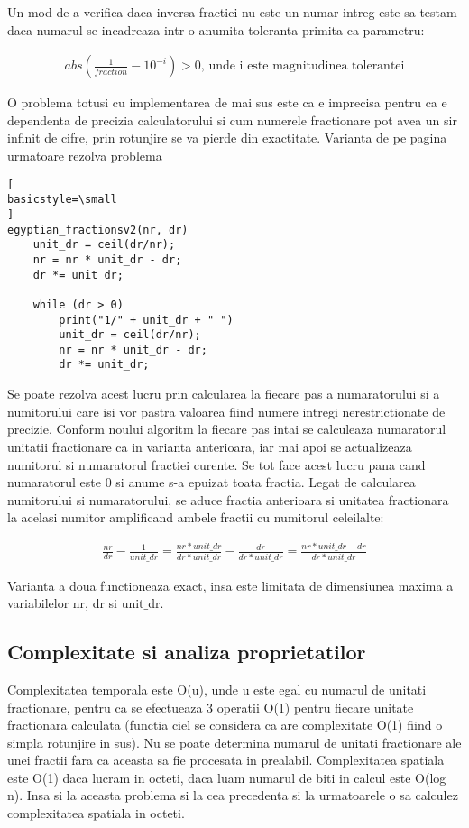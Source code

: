 \documentclass[runningheads]{llncs}
\begin{document}
Un mod de a verifica daca inversa fractiei nu este un numar intreg este sa testam daca numarul se incadreaza intr-o anumita toleranta primita
ca parametru:

\begin{align*}
abs(\frac{1}{fraction} - 10^{-i}) > 0\text{, unde i este magnitudinea tolerantei}
\end{align*}

O problema totusi cu implementarea de mai sus este ca e imprecisa pentru ca e dependenta de precizia calculatorului si cum numerele fractionare
pot avea un sir infinit de cifre, prin rotunjire se va pierde din exactitate. Varianta de pe pagina urmatoare rezolva problema
\newpage
\begin{lstlisting}[
basicstyle=\small
]
egyptian_fractionsv2(nr, dr)
	unit_dr = ceil(dr/nr);
	nr = nr * unit_dr - dr;
	dr *= unit_dr;
	
	while (dr > 0)
		print("1/" + unit_dr + " ")
		unit_dr = ceil(dr/nr);
		nr = nr * unit_dr - dr;
		dr *= unit_dr;
\end{lstlisting}
\vspace*{1em}
Se poate rezolva acest lucru prin calcularea la fiecare pas a numaratorului si a numitorului care isi vor pastra valoarea fiind numere intregi
nerestrictionate de precizie. Conform noului algoritm la fiecare pas intai se calculeaza numaratorul unitatii fractionare ca in varianta anterioara,
iar mai apoi se actualizeaza numitorul si numaratorul fractiei curente. Se tot face acest lucru pana cand numaratorul este 0 si anume s-a
epuizat toata fractia. Legat de calcularea numitorului si numaratorului, se aduce fractia anterioara si unitatea fractionara la 
acelasi numitor amplificand ambele fractii cu numitorul celeilalte:

\begin{align*}
\frac{nr}{dr} - \frac{1}{unit\_dr} = \frac{nr * unit\_dr}{dr * unit\_dr} - \frac{dr}{dr * unit\_dr} = \frac{nr * unit\_dr - dr}{dr * unit\_dr}
\end{align*}

Varianta a doua functioneaza exact, insa este limitata de dimensiunea maxima a variabilelor nr, dr si unit$\_$dr.
\subsection{Complexitate si analiza proprietatilor}
Complexitatea temporala este O(u), unde u este egal cu numarul de unitati fractionare, pentru ca se efectueaza 3 operatii O(1) pentru fiecare unitate
fractionara calculata (functia ciel se considera ca are complexitate O(1) fiind o simpla rotunjire in sus). Nu se poate determina numarul de unitati
fractionare ale unei fractii fara ca aceasta sa fie procesata in prealabil. Complexitatea spatiala este O(1) daca lucram in octeti, daca luam numarul de biti
in calcul este O(log n). Insa si la aceasta problema si la cea precedenta si la urmatoarele o sa calculez complexitatea spatiala in octeti.
\end{document}
